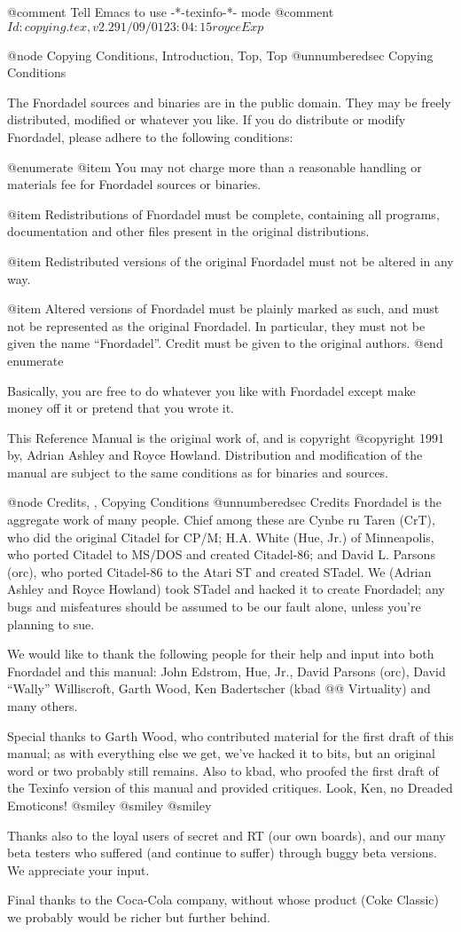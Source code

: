 @comment Tell Emacs to use -*-texinfo-*- mode
@comment $Id: copying.tex,v 2.2 91/09/01 23:04:15 royce Exp $

@node Copying Conditions, Introduction, Top, Top
@unnumberedsec Copying Conditions

The Fnordadel sources and binaries are in the public domain.  They may be
freely distributed, modified or whatever you like.  If you do distribute
or modify Fnordadel, please adhere to the following conditions:

@enumerate
@item
You may not charge more than a reasonable handling or materials
fee for Fnordadel sources or binaries.

@item
Redistributions of Fnordadel must be complete, containing all programs,
documentation and other files present in the original distributions.

@item
Redistributed versions of the original Fnordadel must not be altered in any way.

@item
Altered versions of Fnordadel must be plainly marked as such, and must not
be represented as the original Fnordadel.  In particular, they must not be
given the name ``Fnordadel''.  Credit must be given to the original authors.
@end enumerate

Basically, you are free to do whatever you like with Fnordadel except make
money off it or pretend that you wrote it.

This Reference Manual is the original work of, and is copyright @copyright{}
1991 by, Adrian Ashley and Royce Howland.  Distribution and modification of
the manual are subject to the same conditions as for binaries and sources.

@node Credits,  , Copying Conditions
@unnumberedsec Credits
Fnordadel is the aggregate work of many people.  Chief among these are
Cynbe ru Taren (CrT), who did the original Citadel for CP/M;
H.A. White (Hue, Jr.) of Minneapolis, who ported Citadel to MS/DOS and
created Citadel-86; and
David L. Parsons (orc), who ported Citadel-86 to the Atari ST and created
STadel.  We (Adrian
Ashley and Royce Howland) took STadel and hacked it to create Fnordadel; any
bugs and misfeatures should be assumed to be our fault alone, unless
you're planning to sue.

We would like to thank the following people for their help and input
into both Fnordadel and this manual:
John Edstrom, Hue, Jr., David Parsons (orc), David ``Wally'' Williscroft,
Garth Wood, Ken Badertscher (kbad @@ Virtuality) and many others.

Special thanks to Garth Wood, who contributed material for the first draft
of this manual; as with everything else we get, we've hacked it to bits, but
an original word or two probably still remains.  Also to kbad, who proofed
the first draft of the Texinfo version of this manual and provided critiques.
Look, Ken, no Dreaded Emoticons!  @smiley{}  @smiley{}  @smiley{}

Thanks also to the loyal users of secret and RT (our own boards), and our
many beta testers who suffered (and continue to suffer)
through buggy beta versions.  We appreciate your input.

Final thanks to the Coca-Cola company, without whose product (Coke Classic)
we probably would be richer but further behind.
